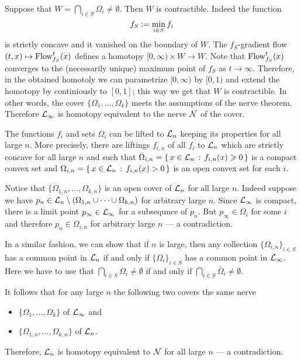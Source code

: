 Suppose that $W=\bigcap_{i\in S}\Omega_{i}\ne \emptyset$.
Then $W$ is contractible.
Indeed the function 
\[f_S\mathrel{:=}\min_{i\in S} f_i\]
is strictly concave and it vanished on the boundary of $W$.
The $f_S$-gradient flow $(t,x)\mapsto \mathop{\rm Flow}\nolimits_{f_S}^t(x)$ defines a homotopy
$[0,\infty)\times W\to W$.
Note that $\mathop{\rm Flow}\nolimits_{f_S}^t(x)$ converges to the (necessarily unique) maximum point of $f_S$ as $t\to\infty$.
Therefore, in the obtained homotoly we can parametrize $[0,\infty)$ by $[0,1)$ and extend the homotopy by continiously to $[0,1]$;
this way we get that $W$ is contractible.
In other words, the cover $\{\Omega_1,\dots, \Omega_k\}$ meets the assumptions of the nerve theorem.
Therefore $\mathcal{L}_\infty$ is homotopy equivalent to the nerve $\mathcal{N}$ of the cover.

The functions $f_i$ and sets $\Omega_i$ can be lifted to $\mathcal{L}_n$ keeping its properties for all large $n$. 
More precisely, there are liftings $f_{i,n}$ of all $f_i$ to $\mathcal{L}_n$ which are strictly concave for all large $n$ and such that $\bar\Omega_{i,n}=\left\{\,{x\in \mathcal{L}_n}\,:\,{f_{i,n}(x)\geqslant 0}\,\right\}$ is a compact convex set and $\Omega_{i,n}\z=\set{x\in \spc{L}_n}{f_{i,n}(x)> 0}$ is an open convex set for each $i$.

Notice that $\{\Omega_{1,n},\dots,\Omega_{k,n}\}$ is an open cover of $\mathcal{L}_n$ for all large $n$.
Indeed suppose we have $p_n\in \mathcal{L}_n\setminus(\Omega_{1,n}\cup\dots\cup\Omega_{k,n})$ for arbitrary large $n$.
Since $\mathcal{L}_\infty$ is compact, there is a limit point $p_\infty\in \mathcal{L}_\infty$ for a subsequnce of $p_n$.
But $p_\infty\in\Omega_i$ for some $i$ and therefore $p_n\in \Omega_{i,n}$ for arbitrary large $n$ --- a contradiction.

In a similar fashion, we can show that if $n$ is large, then any collection $\{\Omega_{i,n}\}_{i\in S}$ has a common point in $\mathcal{L}_n$ 
if and only if $\{\Omega_{i}\}_{i\in S}$ has a common point in $\mathcal{L}_\infty$.
Here we have to use that $\bigcap_{i\in S}\Omega_{i}\ne \emptyset$ if and only if $\bigcap_{i\in S}\bar\Omega_{i}\ne \emptyset$.

It follows that for any large $n$ the following two covers the same nerve
\begin{itemize}
\item $\{\Omega_{1},\dots,\Omega_{k}\}$ of $\mathcal{L}_\infty$ and 
\item $\{\Omega_{1,n},\dots,\Omega_{k,n}\}$ of $\mathcal{L}_n$.
\end{itemize}
Therefore, $\mathcal{L}_n$ is homotopy equivalent to $\mathcal{N}$ for all large $n$ --- a contradiction.
\qeds


